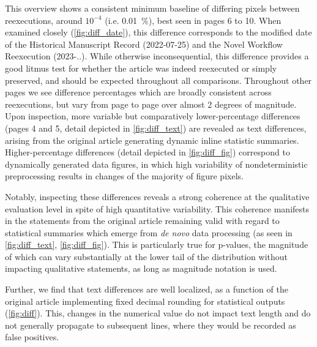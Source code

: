 This overview shows a consistent minimum baseline of differing pixels between reexecutions, around $10^{-4}$ (i.e. \SI{0.01}{\percent}), best seen in pages 6 to 10.
When examined closely (\ref{fig:diff_date}), this difference corresponds to the modified date of the Historical Manuscript Record (2022-07-25) and the Novel Workflow Reexecution (2023-..).
While otherwise inconsequential, this difference provides a good litmus test for whether the article was indeed reexecuted or simply preserved, and should be expected throughout all comparisons.
Throughout other pages we see difference percentages which are broadly consistent across reexecutions, but vary from page to page over almost 2 degrees of magnitude.
Upon inspection, more variable but comparatively lower-percentage differences (pages 4 and 5, detail depicted in \cref{fig:diff_text}) are revealed as text differences, arising from the original article generating dynamic inline statistic summaries.
Higher-percentage differences (detail depicted in \cref{fig:diff_fig}) correspond to dynamically generated data figures, in which high variability of nondeterministic preprocessing results in changes of the majority of figure pixels.

Notably, inspecting these differences reveals a strong coherence at the qualitative evaluation level in spite of high quantitative variability.
This coherence manifests in the statements from the original article remaining valid with regard to statistical summaries which emerge from  \textit{de novo} data processing (as seen in \ref{fig:diff_text}, \ref{fig:diff_fig}).
This is particularly true for p-values, the magnitude of which can vary substantially at the lower tail of the distribution without impacting qualitative statements, as long as magnitude notation is used.

Further, we find that text differences are well localized, as a function of the original article implementing fixed decimal rounding for statistical outputs (\cref{fig:diff}).
This, changes in the numerical value do not impact text length and do not generally propagate to subsequent lines, where they would be recorded as false positives.

